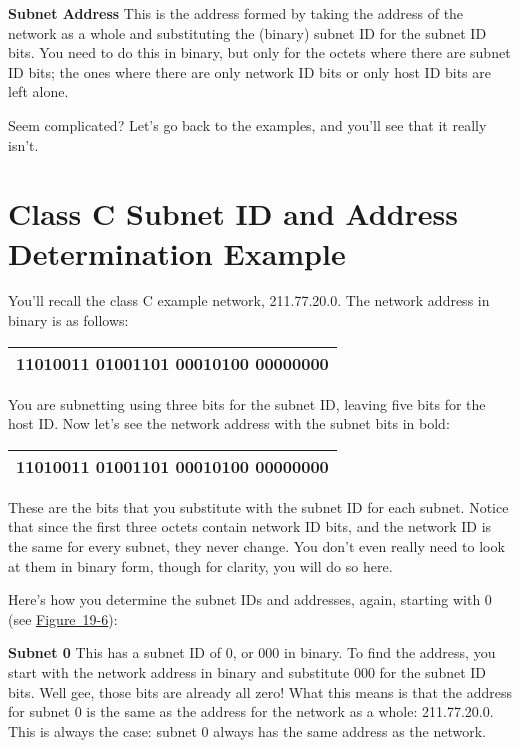 {\textbf{Subnet Address}} This is the address formed by taking the
address of the network as a whole and substituting the (binary) subnet
ID for the subnet ID bits. You need to do this in binary, but only for
the octets where there are subnet ID bits; the ones where there are only
network ID bits or only host ID bits are left alone.

Seem complicated? Let's go back to the examples, and you'll see that it
really isn't.

\section{Class C Subnet ID and Address Determination Example}

You'll recall the class C example network, 211.77.20.0. The network
address in binary is as follows:

\begin{longtable}[]{@{}l@{}}
\toprule
\endhead
11010011 01001101 00010100 00000000\tabularnewline
\bottomrule
\end{longtable}

You are subnetting using three bits for the subnet ID, leaving five bits
for the host ID. Now let's see the network address with the subnet bits
in bold:

\begin{longtable}[]{@{}l@{}}
\toprule
\endhead
11010011 01001101 00010100 {\textbf{000}}00000\tabularnewline
\bottomrule
\end{longtable}

These are the bits that you substitute with the subnet ID for each
subnet. Notice that since the first three octets contain network ID
bits, and the network ID is the same for every subnet, they never
change. You don't even really need to look at them in binary form,
though for clarity, you will do so here.

Here's how you determine the subnet IDs and addresses, again, starting
with 0 (see
\protect\hyperlink{ch19s04.htmlux5cux23determining_subnet_addresses_for_a_class}{Figure~19-6}):

{\textbf{Subnet 0}} This has a subnet ID of 0, or 000 in binary. To find
the address, you start with the network address in binary and substitute
000 for the subnet ID bits. Well gee, those bits are already all zero!
What this means is that the address for subnet 0 is the same as the
address for the network as a whole: 211.77.20.0. This is always the
case: subnet 0 always has the same address as the network.

